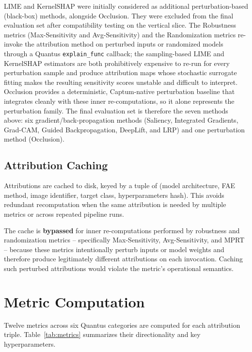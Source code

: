 LIME and KernelSHAP were initially considered as additional perturbation-based
(black-box) methods, alongside Occlusion. They were excluded from the final
evaluation set after compatibility testing on the vertical slice. The
Robustness metrics (Max-Sensitivity and Avg-Sensitivity) and the
Randomization metrics re-invoke the attribution method on perturbed inputs or
randomized models through a Quantus \texttt{explain\_func} callback; the
sampling-based LIME and KernelSHAP estimators are both prohibitively expensive
to re-run for every perturbation sample and produce attribution maps whose
stochastic surrogate fitting makes the resulting sensitivity scores unstable
and difficult to interpret. Occlusion provides a deterministic, Captum-native
perturbation baseline that integrates cleanly with these inner re-computations,
so it alone represents the perturbation family. The final evaluation set is
therefore the seven methods above: six gradient/back-propagation methods
(Saliency, Integrated Gradients, Grad-CAM, Guided Backpropagation, DeepLift,
and LRP) and one perturbation method (Occlusion).

\subsection{Attribution Caching}
\label{subsec:caching}

Attributions are cached to disk, keyed by a tuple of (model architecture,
FAE method, image identifier, target class, hyperparameters hash). This
avoids redundant recomputation when the same attribution is needed by
multiple metrics or across repeated pipeline runs.

The cache is \textbf{bypassed} for inner re-computations performed by
robustness and randomization metrics -- specifically Max-Sensitivity,
Avg-Sensitivity, and MPRT -- because these metrics intentionally perturb
inputs or model weights and therefore produce legitimately different
attributions on each invocation. Caching such perturbed attributions would
violate the metric's operational semantics.

\section{Metric Computation}
\label{sec:metrics}

Twelve metrics across six Quantus categories are computed for each
attribution triple. Table~\ref{tab:metrics} summarizes their directionality
and key hyperparameters.

